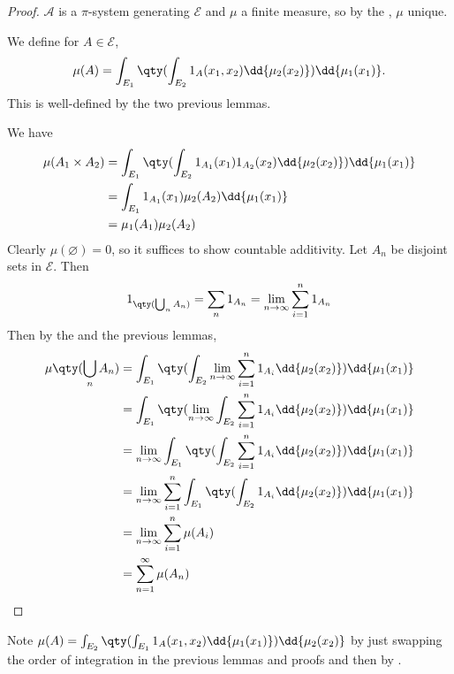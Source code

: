 \begin{proof}
	$\mathcal A$ is a $\pi$-system generating $\mathcal E$ and $\mu$ a finite measure, so by the , $\mu$ unique.

	We define for $A \in \mathcal{E}$,
	\[ \mu(A) = \int_{E_1} \qty( \int_{E_2} 1_A(x_1,x_2) \dd{\mu_2(x_2)} ) \dd{\mu_1(x_1)}. \]
	This is well-defined by the two previous lemmas.

	We have
	\begin{align*}
		\mu(A_1 \times A_2) &= \int_{E_1} \qty( \int_{E_2} 1_{A_1}(x_1) 1_{A_2}(x_2) \dd{\mu_2(x_2)} ) \dd{\mu_1(x_1)} \\
		&= \int_{E_1} 1_{A_1}(x_1) \mu_2(A_2) \dd{\mu_1(x_1)} \\
		&= \mu_1(A_1) \mu_2(A_2)
	\end{align*}
	Clearly $\mu(\varnothing) = 0$, so it suffices to show countable additivity.
	Let $A_n$ be disjoint sets in $\mathcal E$.
	Then
	\[ 1_{\qty(\bigcup_n A_n)} = \sum_n 1_{A_n} = \lim_{n \to \infty} \sum_{i=1}^n 1_{A_n} \]
	Then by the  and the previous lemmas,
	\begin{align*}
		\mu\qty(\bigcup_n A_n) &= \int_{E_1} \qty( \int_{E_2} \lim_{n \to \infty} \sum_{i=1}^n 1_{A_i} \dd{\mu_2(x_2)} ) \dd{\mu_1(x_1)} \\
		&= \int_{E_1} \qty( \lim_{n \to \infty} \int_{E_2} \sum_{i=1}^n 1_{A_i} \dd{\mu_2(x_2)} ) \dd{\mu_1(x_1)} \\
		&= \lim_{n \to \infty} \int_{E_1} \qty( \int_{E_2} \sum_{i=1}^n 1_{A_i} \dd{\mu_2(x_2)} ) \dd{\mu_1(x_1)} \\
		&= \lim_{n \to \infty} \sum_{i=1}^n \int_{E_1} \qty( \int_{E_2} 1_{A_i} \dd{\mu_2(x_2)} ) \dd{\mu_1(x_1)} \\
		&= \lim_{n \to \infty} \sum_{i=1}^n \mu(A_i) \\
		&= \sum_{n=1}^\infty \mu(A_n)
	\end{align*}
\end{proof}

\begin{remark}
	Note $\mu(A) = \int_{E_2} \qty(\int_{E_1} 1_A(x_1, x_2) \dd{\mu_1(x_1)}) \dd{\mu_2(x_2)}$ by just swapping the order of integration in the previous lemmas and proofs and then by .
\end{remark}

